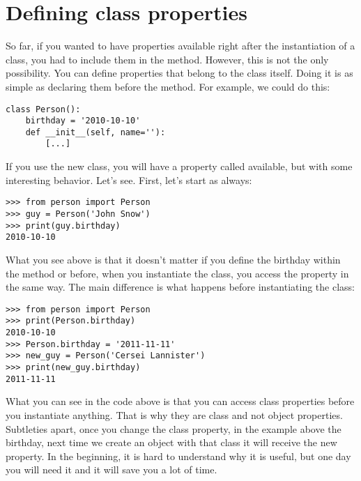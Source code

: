 
\section{Defining class properties}
So far, if you wanted to have properties available right after the instantiation of a class, you had to include them in the  method. However, this is not the only possibility. You can define properties that belong to the class itself. Doing it is as simple as declaring them before the  method. For example, we could do this:

\begin{verbatim}
class Person():
    birthday = '2010-10-10'
    def __init__(self, name=''):
        [...]
\end{verbatim}

If you use the new  class, you will have a property called  available, but with some interesting behavior. Let's see. First, let's start as always:

\begin{verbatim}
>>> from person import Person
>>> guy = Person('John Snow')
>>> print(guy.birthday)
2010-10-10
\end{verbatim}

What you see above is that it doesn't matter if you define the birthday within the  method or before, when you instantiate the class, you access the property in the same way. The main difference is what happens before instantiating the class:

\begin{verbatim}
>>> from person import Person
>>> print(Person.birthday)
2010-10-10
>>> Person.birthday = '2011-11-11'
>>> new_guy = Person('Cersei Lannister')
>>> print(new_guy.birthday)
2011-11-11
\end{verbatim}

What you can see in the code above is that you can access class properties before you instantiate anything. That is why they are class and not object properties. Subtleties apart, once you change the class property, in the example above the birthday, next time we create an object with that class it will receive the new property. In the beginning, it is hard to understand why it is useful, but one day you will need it and it will save you a lot of time. 

